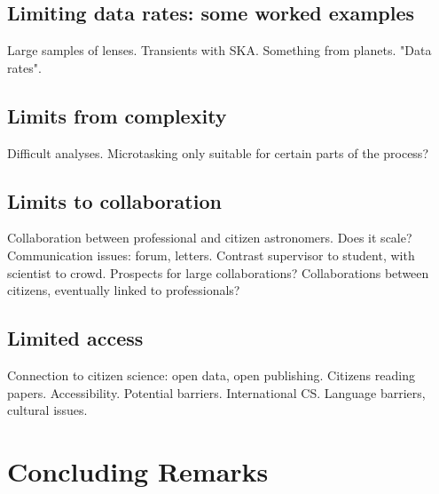 \documentclass{ar2e}
\begin{document}

\subsection{Limiting data rates: some worked examples}
\label{sec:limits:data}

Large samples of lenses.  Transients with SKA.  Something from
planets. "Data rates". 


\subsection{Limits from complexity}
\label{sec:limits:complexity}

Difficult analyses. Microtasking only suitable for certain parts of the process?


\subsection{Limits to collaboration}
\label{sec:limits:collab}

Collaboration between professional and citizen astronomers. Does it scale?
Communication issues: forum, letters. Contrast supervisor to student, with
scientist to crowd. Prospects for large collaborations? Collaborations between
citizens, eventually linked to professionals?


\subsection{Limited access}
\label{sec:limits:access}

Connection to citizen science: open data, open publishing. Citizens reading
papers. Accessibility. Potential barriers. International CS. Language barriers, 
cultural issues. 


\section{Concluding Remarks}
\label{sec:conclusion}
\end{document}
